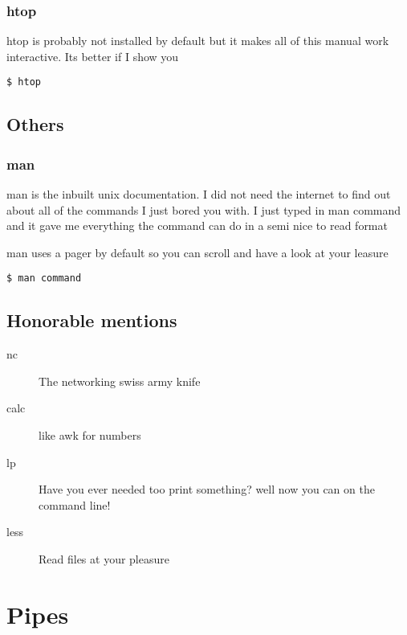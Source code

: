 \documentclass[a4paper]{article}
\begin{document}
\subsubsection*{htop}
\label{sec:org4cb0dc7}
\begin{notes}
	htop is probably not installed by default but it makes all of this manual work
	interactive. Its better if I show you
\end{notes}

\begin{verbatim}
$ htop
\end{verbatim}
\subsection*{Others}
\label{sec:org41c1523}
\subsubsection*{man}
\label{sec:orgaa08c40}
\begin{notes}
	man is the inbuilt unix documentation. I did not need the internet to find out
	about all of the commands I just bored you with. I just typed in man command and
	it gave me everything the command can do in a semi nice to read format

	man uses a pager by default so you can scroll and have a look at your leasure
\end{notes}

\begin{verbatim}
$ man command
\end{verbatim}
\subsection*{Honorable mentions}
\label{sec:orgec3dc3d}
\begin{description}
	\item[{nc}] The networking swiss army knife
	\item[{calc}] like awk for numbers
	\item[{lp}] Have you ever needed too print something? well now you can on the
		command line!
	\item[{less}] Read files at your pleasure
\end{description}

\section*{Pipes}
\label{sec:org9b6c5c5}
\end{document}
